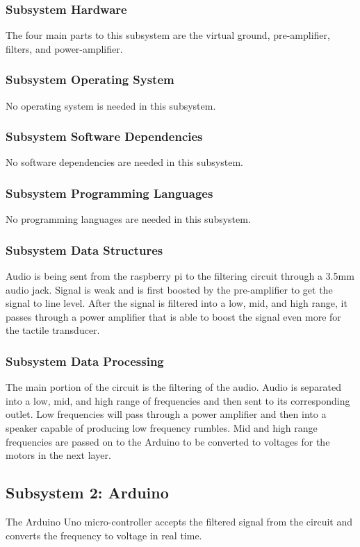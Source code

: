 \subsubsection{Subsystem Hardware}
The four main parts to this subsystem are the virtual ground, pre-amplifier, filters, and power-amplifier.

\subsubsection{Subsystem Operating System}
No operating system is needed in this subsystem.

\subsubsection{Subsystem Software Dependencies}
No software dependencies are needed in this subsystem.

\subsubsection{Subsystem Programming Languages}
No programming languages are needed in this subsystem.

\subsubsection{Subsystem Data Structures}
Audio is being sent from the raspberry pi to the filtering circuit through a 3.5mm audio jack. Signal is weak and is first boosted by the pre-amplifier to get the signal to line level. After the signal is filtered into a low, mid, and high range, it passes through a power amplifier that is able to boost the signal even more for the tactile transducer.

\subsubsection{Subsystem Data Processing}
The main portion of the circuit is the filtering of the audio. Audio is separated into a low, mid, and high range of frequencies and then sent to its corresponding outlet. Low frequencies will pass through a power amplifier and then into a speaker capable of producing low frequency rumbles. Mid and high range frequencies are passed on to the Arduino to be converted to voltages for the motors in the next layer. 

\subsection{Subsystem 2: Arduino}
The Arduino Uno micro-controller accepts the filtered signal from the circuit and converts the frequency to voltage in real time.

